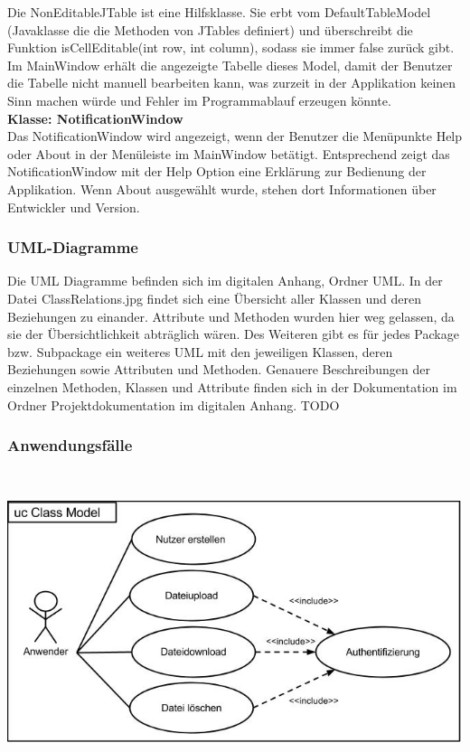 \documentclass[12pt,a4paper,bibliography=totocnumbered,listof=totocnumbered]{scrartcl}
\begin{document}
Die NonEditableJTable ist eine Hilfsklasse. Sie erbt vom DefaultTableModel (Javaklasse die die Methoden von JTables definiert) und überschreibt die Funktion isCellEditable(int row, int column), sodass sie immer false zurück gibt. Im MainWindow erhält die angezeigte Tabelle dieses Model, damit der Benutzer die Tabelle nicht manuell bearbeiten kann, was zurzeit in der Applikation keinen Sinn machen würde und Fehler im Programmablauf erzeugen könnte.\\
\textbf{Klasse: NotificationWindow}\\
Das NotificationWindow wird angezeigt, wenn der Benutzer die Menüpunkte Help oder About in der Menüleiste im MainWindow betätigt. Entsprechend zeigt das NotificationWindow mit der Help Option eine Erklärung zur Bedienung der Applikation. Wenn About ausgewählt wurde, stehen dort Informationen über Entwickler und Version.


\subsubsection{UML-Diagramme}
Die UML Diagramme befinden sich im digitalen Anhang, Ordner UML. In der Datei ClassRelations.jpg findet sich eine Übersicht aller Klassen und deren Beziehungen zu einander. Attribute und Methoden wurden hier weg gelassen, da sie der Übersichtlichkeit abträglich wären. Des Weiteren gibt es für jedes Package bzw. Subpackage ein weiteres UML mit den jeweiligen Klassen, deren Beziehungen sowie Attributen und Methoden. Genauere Beschreibungen der einzelnen Methoden, Klassen und Attribute finden sich in der Dokumentation im Ordner Projektdokumentation im digitalen Anhang. TODO

\pagebreak

\subsubsection{Anwendungsfälle}
\vspace{0,5em}
$\;$\\
\begin{minipage}{\linewidth}
	\centering
	\includegraphics[width=0.8\linewidth]{./img/UseCase.jpg}
\end{minipage}
\vspace{0,em}
\end{document}
